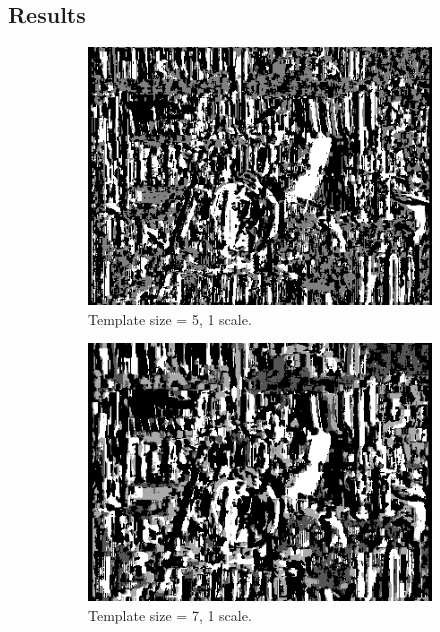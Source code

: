 \documentclass[12pt,a4paper,oneside,final]{article}
\begin{document}
\subsection{Results}
\begin{figure}[H]
\centering
\begin{subfigure}[b]{0.24\textwidth}
	\includegraphics[width=\textwidth]{disparity_s1_k5set_1.png}
	\caption{Template size = 5, 1 scale.}
\end{subfigure}
\begin{subfigure}[b]{0.24\textwidth}
	\includegraphics[width=\textwidth]{disparity_s1_k7set_1.png}
	\caption{Template size = 7, 1 scale.}
\end{subfigure}
\begin{subfigure}[b]{0.24\textwidth}

\end{subfigure}
\end{figure}
\end{document}
